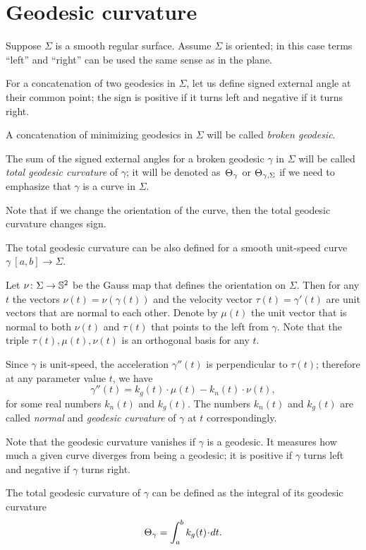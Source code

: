 \section{Geodesic curvature}

Suppose $\Sigma$ is a smooth regular surface.
Assume $\Sigma$ is oriented;
in this case terms ``left'' and ``right'' can be used the same sense as in the plane.

For a concatenation of two geodesics in $\Sigma$, let us define signed external angle at their common point;
the sign is positive if it turns left and negative if it turns right. 

A concatenation of minimizing geodesics in $\Sigma$ will be called \emph{broken geodesic}.

The sum of the signed external angles for a broken geodesic $\gamma$ in $\Sigma$ will be called \emph{total geodesic curvature} of $\gamma$; it will be denoted as~$\Theta_{\gamma}$ or $\Theta_{\gamma,\Sigma}$ if we need to emphasize that $\gamma$ is a curve in $\Sigma$.

Note that if we change the orientation of the curve, then the total geodesic curvature changes sign.

The total geodesic curvature can be also defined for a smooth unit-speed curve $\gamma\:[a,b]\to\Sigma$.

Let $\nu\colon\Sigma\to \mathbb{S}^2$ be the Gauss map that defines the orientation on $\Sigma$.
Then for any $t$ the vectors $\nu(t)=\nu(\gamma(t))$ and the velocity vector $\tau(t)=\gamma'(t)$ are unit vectors that are normal to each other.
Denote by $\mu(t)$ the unit vector that is normal to both $\nu(t)$ and $\tau(t)$ that points to the left from $\gamma$.
Note that the triple $\tau(t),\mu(t),\nu(t)$ is an orthogonal basis for any $t$.

Since $\gamma$ is unit-speed, the acceleration $\gamma''(t)$ is perpendicular to $\tau(t)$;
therefore at any parameter value $t$, we have
\[\gamma''(t)=k_g(t)\cdot \mu(t)-k_n(t)\cdot \nu(t),\]
for some real numbers $k_n(t)$ and $k_g(t)$.
The numbers $k_n(t)$ and $k_g(t)$ are called \emph{normal} and \emph{geodesic curvature} of $\gamma$ at $t$ correspondingly.

Note that the geodesic curvature vanishes if $\gamma$ is a geodesic. 
It measures how much a given curve diverges from being a geodesic;
it is positive if $\gamma$ turns left and negative if $\gamma$ turns right.

The total geodesic curvature of $\gamma$ can be defined as the integral of its geodesic curvature
\[\tgc\gamma=\int_a^b k_g(t)\cdot dt.\]

